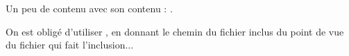 Un peu de contenu avec son contenu : .


On est obligé d'utiliser \verb!!,
en donnant le chemin du fichier inclus du point de vue du fichier qui fait l'inclusion...